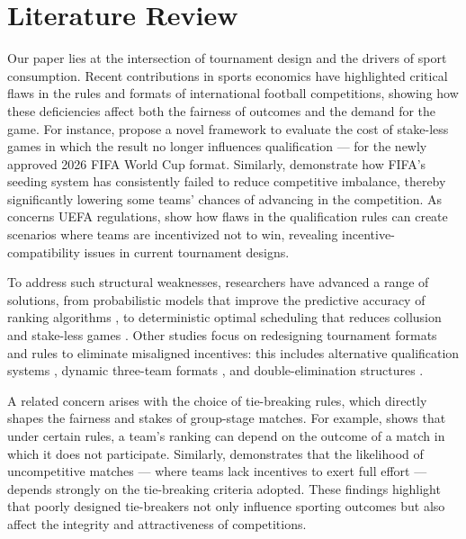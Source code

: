 \documentclass[11pt]{article}
\begin{document}
\section{Literature Review}
\label{sec:literature}

Our paper lies at the intersection of tournament design and the drivers of sport consumption. Recent contributions in sports economics have highlighted critical flaws in the rules and formats of international football competitions, showing how these deficiencies affect both the fairness of outcomes and the demand for the game. For instance, \citet{csato2025increasing} propose a novel framework to evaluate the cost of stake-less games in which the result no longer influences qualification — for the newly approved 2026 FIFA World Cup format. Similarly, \citet{lapre2023evolution, lapre2022quantifying} demonstrate how FIFA's seeding system has consistently failed to reduce competitive imbalance, thereby significantly lowering some teams' chances of advancing in the competition. As concerns UEFA regulations, \citet{csato2020neither} show how flaws in the qualification rules can create scenarios where teams are incentivized not to win, revealing incentive-compatibility issues in current tournament designs.

To address such structural weaknesses, researchers have advanced a range of solutions, from probabilistic models that improve the predictive accuracy of ranking algorithms \citep{szczecinski2022fifa}, to deterministic optimal scheduling that reduces collusion and stake-less games \citep{chater2021fixing}. Other studies focus on redesigning tournament formats and rules to eliminate misaligned incentives: this includes alternative qualification systems \citep{guajardo2024tournament}, dynamic three-team formats \citep{troyano2023new}, and double-elimination structures \citep{renno2023double}.

\vspace{0.5em}

A related concern arises with the choice of tie-breaking rules, which directly shapes the fairness and stakes of group-stage matches. For example, \citet{berker2014tie} shows that under certain rules, a team's ranking can depend on the outcome of a match in which it does not participate. Similarly, \citet{csato2023avoid} demonstrates that the likelihood of uncompetitive matches — where teams lack incentives to exert full effort — depends strongly on the tie-breaking criteria adopted. These findings highlight that poorly designed tie-breakers not only influence sporting outcomes but also affect the integrity and attractiveness of competitions.
\end{document}
